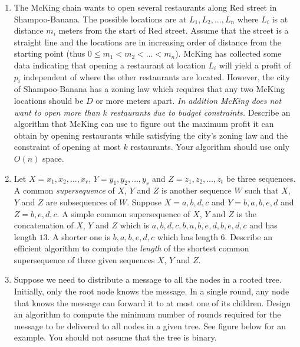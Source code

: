 \documentclass[11pt]{article}
\begin{document}
\begin{enumerate}


\item The McKing chain wants to open several restaurants along Red
  street in Shampoo-Banana. The possible locations are at $L_1,L_2,
  \ldots, L_n$ where $L_i$ is at distance $m_i$ meters from the start
  of Red street. Assume that the street is a straight line and the
  locations are in increasing order of distance from the starting
  point (thus $0 \leq m_1 < m_2 < \ldots < m_n$). McKing has collected
  some data indicating that opening a restaurant at location $L_i$
  will yield a profit of $p_i$ independent of where the other
  restaurants are located. However, the city of Shampoo-Banana has a
  zoning law which requires that any two McKing locations should be
  $D$ or more meters apart. {\em In addition McKing does not want to
    open more than $k$ restaurants due to budget constraints.}
  Describe an algorithm that McKing can use to figure out the maximum
  profit it can obtain by opening restaurants while satisfying the
  city's zoning law and the constraint of opening at most $k$
  restaurants.  Your algorithm should use only $O(n)$ space.


\item Let $X = x_1,x_2,\ldots,x_r$, $Y = y_1,y_2,\ldots,y_s$ and $Z =
  z_1,z_2,\ldots,z_t$ be three sequences. A common {\em supersequence}
  of $X$, $Y$ and $Z$ is another sequence $W$ such that $X$, $Y$ and $Z$
  are subsequences of $W$. Suppose $X = a,b,d,c$ and $Y = b,a,b,e,d$ and $Z =
  b, e, d, c$. A simple common supersequence of $X$, $Y$ and $Z$ is
  the concatenation of $X$, $Y$ and $Z$ which is
  $a,b,d,c,b,a,b,e,d,b,e,d,c$ and has length $13$. A shorter one is
  $b, a, b, e, d, c$ which has length $6$.  Describe an efficient
  algorithm to compute the {\em length} of the shortest common
  supersequence of three given sequences $X$, $Y$ and $Z$.

\item Suppose we need to distribute a message to all the nodes in a
  rooted tree. Initially, only the root node knows the message. In a
  single round, any node that knows the message can forward it to at
  most one of its children. Design an algorithm to compute the minimum
  number of rounds required for the message to be delivered to all
  nodes in a given tree.   See figure below for an example. 
  You should not assume that the tree is binary.


\end{enumerate}
\vspace{1in}
\end{document}
